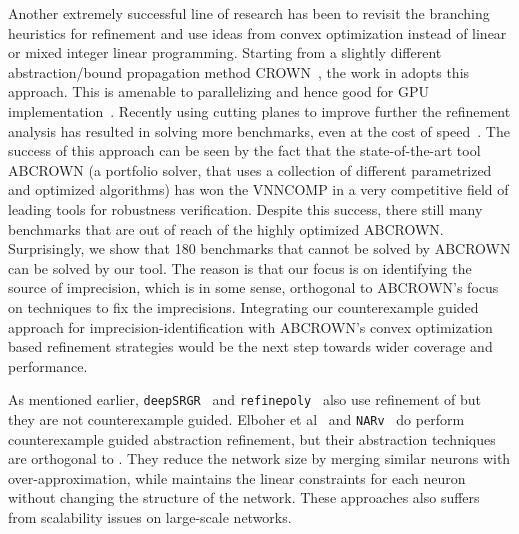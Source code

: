 

\medskip

Another extremely successful line of research has been to revisit the branching heuristics for refinement and use ideas from convex optimization instead of linear or mixed integer linear programming. Starting from a slightly different abstraction/bound propagation method CROWN~\cite{crown}, the work in \cite{betacrown} adopts this approach. This is amenable to parallelizing and hence good for GPU implementation~\cite{gpucrown}. Recently using cutting planes to improve further the refinement analysis has resulted in solving more benchmarks, even at the cost of speed~\cite{cutting-planes}. The success of this approach can be seen by the fact that the state-of-the-art tool ABCROWN (a portfolio solver, that uses a collection of different parametrized and optimized algorithms) has won the VNNCOMP in a very competitive field of leading tools for robustness verification. Despite this success, there still many benchmarks that are out of reach of the highly optimized ABCROWN. Surprisingly, we show that 180 benchmarks that cannot be solved by ABCROWN can be solved by our tool. The reason is that our focus is on identifying the source of imprecision, which is in some sense, orthogonal to ABCROWN's focus on techniques to fix the imprecisions. Integrating our counterexample guided approach for imprecision-identification with ABCROWN's convex optimization based refinement strategies would be the next step towards wider coverage and performance.%

As mentioned earlier, \texttt{deepSRGR}~\cite{yang2021improving} and \texttt{refinepoly}~\cite{singh2019beyond} also use refinement of \deeppoly{} but they are not counterexample guided. Elboher et al~\cite{elboher2020abstraction} and \texttt{NARv}~\cite{liu2022abstraction} do perform counterexample guided abstraction refinement, but their abstraction techniques are orthogonal to \deeppoly{}.  They reduce the network size by merging similar  neurons with over-approximation, while \deeppoly{} maintains the linear constraints for each neuron without changing the structure of the network. These approaches also suffers from scalability issues on large-scale networks.

